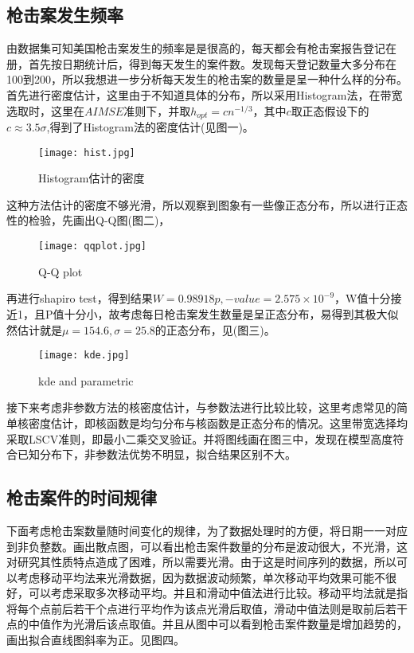 \documentclass[12pt]{ctexart}
\begin{document}
\subsection{枪击案发生频率}
由数据集可知美国枪击案发生的频率是是很高的，每天都会有枪击案报告登记在册，首先按日期统计后，得到每天发生的案件数。发现每天登记数量大多分布在100到200，所以我想进一步分析每天发生的枪击案的数量是呈一种什么样的分布。首先进行密度估计，这里由于不知道具体的分布，所以采用Histogram法，在带宽选取时，这里在$AIMSE$准则下，并取$h_{o p t}=c n^{-1 / 3}$，其中$ c $取正态假设下的$c \approx 3.5 \sigma$,得到了Histogram法的密度估计(见图一)。

\begin{figure}[!htb]
	\centering
	\texttt{[image: hist.jpg]} %
	\caption{Histogram估计的密度} %
\end{figure}

这种方法估计的密度不够光滑，所以观察到图象有一些像正态分布，所以进行正态性的检验，先画出Q-Q图(图二)，
\begin{figure}[!htb]
	\centering
	\texttt{[image: qqplot.jpg]} %
	\caption{Q-Q plot} %
\end{figure}
再进行shapiro test，得到结果$ W = 0.98918p,-value = 2.575 \times 10^{-9} $，W值十分接近1，且P值十分小，故考虑每日枪击案发生数量是呈正态分布，易得到其极大似然估计就是$ \mu = 154.6, \sigma = 25.8 $的正态分布，见(图三)。
\begin{figure}[!htb]
	\centering
	\texttt{[image: kde.jpg]} %
	\caption{kde and parametric} %
\end{figure}

接下来考虑非参数方法的核密度估计，与参数法进行比较比较，这里考虑常见的简单核密度估计，即核函数是均匀分布与核函数是正态分布的情况。这里带宽选择均采取LSCV准则，即最小二乘交叉验证。并将图线画在图三中，发现在模型高度符合已知分布下，非参数法优势不明显，拟合结果区别不大。

\subsection{枪击案件的时间规律}

下面考虑枪击案数量随时间变化的规律，为了数据处理时的方便，将日期一一对应到非负整数。画出散点图，可以看出枪击案件数量的分布是波动很大，不光滑，这对研究其性质特点造成了困难，所以需要光滑。由于这是时间序列的数据，所以可以考虑移动平均法来光滑数据，因为数据波动频繁，单次移动平均效果可能不很好，可以考虑采取多次移动平均。并且和滑动中值法进行比较。移动平均法就是指将每个点前后若干个点进行平均作为该点光滑后取值，滑动中值法则是取前后若干点的中值作为光滑后该点取值。并且从图中可以看到枪击案件数量是增加趋势的，画出拟合直线图斜率为正。见图四。
\end{document}
